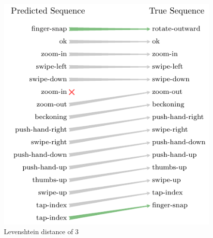 \begin{figure}[h]
  \centering
  \includegraphics{figures/results/levenshtein}
  \caption{Levenshtein distance of 3}
  \label{fig:levenshtein}
\end{figure}

